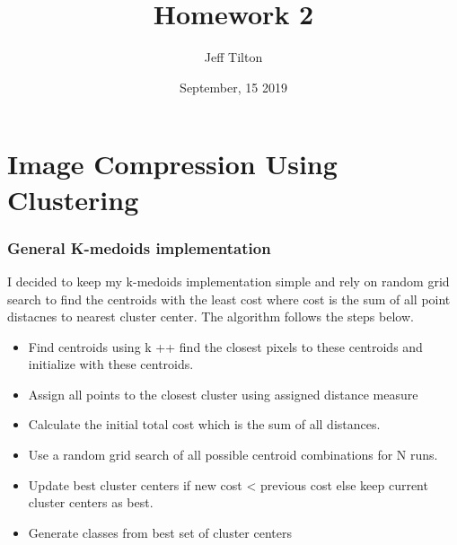 \documentclass[a4paper]{article}
\title{Homework 2}
\author{Jeff Tilton}
\date{September, 15 2019}
\begin{document}
\maketitle

\section{Image Compression Using Clustering}
\subsubsection{General K-medoids implementation}
I decided to keep my k-medoids implementation simple and rely on random grid search to find the centroids with the least cost where cost is the sum of all point distacnes to nearest cluster center.  The algorithm follows the steps below.

	\begin{itemize}
		\item Find centroids using k ++ find the closest pixels to these centroids and initialize with these centroids.
		\item Assign all points to the closest cluster using assigned distance measure
		\item Calculate the initial total cost which is the sum of all distances.
		\item Use a random grid search of all possible centroid combinations for N runs.
		\item Update best cluster centers if new cost < previous cost else keep current cluster centers as best.
		\item Generate classes from best set of cluster centers
	\end{itemize} 
	
\end{document}
